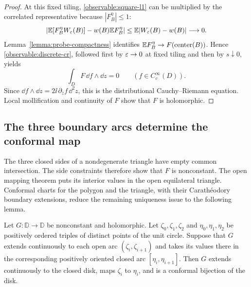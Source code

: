\begin{proof}
At this fixed tiling, \eqref{observable:square-l1} can be multiplied by
the correlated representative because $|F_B^\eta|\le1$:
\[
 \left|\mathbb E[F_B^\eta W_\varepsilon(B)]-w(B)\mathbb E F_B^\eta\right|
 \le\mathbb E|W_\varepsilon(B)-w(B)|\longrightarrow0.
\]
Lemma~\ref{lemma:probe-compactness} identifies
$\mathbb E F_B^\eta\to F(\operatorname{center}(B))$. Hence
\eqref{observable:discrete-cr}, followed first by $\varepsilon\to0$ at fixed
tiling and then by $s\downarrow0$, yields
\begin{equation}
                       \int_D F\,\dd f\wedge\dd z=0
                       \qquad(f\in C_c^\infty(D)).
 \label{observable:cr}
\end{equation}
Since $\dd f\wedge\dd z=2\ii\,\partial_{\bar z}f\,\dd^2z$, this is
the distributional Cauchy--Riemann equation. Local mollification and
continuity of $F$ show that $F$ is holomorphic.
\end{proof}

\subsection{The three boundary arcs determine the conformal map}

The three closed sides of a nondegenerate triangle have empty common
intersection. The side constraints therefore show that $F$ is
nonconstant. The open mapping theorem puts its interior values in the
open equilateral triangle. Conformal charts for the polygon and the
triangle, with their Carath\'eodory boundary extensions, reduce the
remaining uniqueness issue to the following lemma.

\par\ifdim\dimexpr\pagegoal-\pagetotal\relax<6\baselineskip\newpage\fi
\begin{lemma}
\label{lemma:boundary-uniqueness}
Let $G:\mathbb D\to\mathbb D$ be nonconstant and holomorphic. Let
$\zeta_0,\zeta_1,\zeta_2$ and $\eta_0,\eta_1,\eta_2$ be positively
ordered triples of distinct points of the unit circle. Suppose that $G$
extends continuously to each open arc $(\zeta_i,\zeta_{i+1})$ and takes
its values there in the corresponding positively oriented closed arc
$[\eta_i,\eta_{i+1}]$. Then $G$ extends continuously to the closed disk,
maps $\zeta_i$ to $\eta_i$, and is a conformal bijection of the disk.
\end{lemma}

